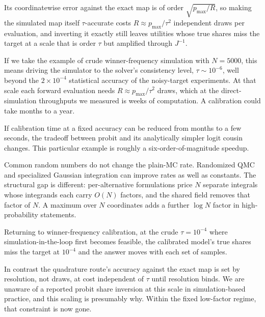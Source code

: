 \documentclass[12pt]{article}
\theoremstyle{remark}
\begin{document}
Its coordinatewise error against the exact map is of order
$\sqrt{p_{\max}/R}$, so making the simulated map itself $\tau$-accurate
costs $R \approx p_{\max}/\tau^2$ independent draws per evaluation, and
inverting it exactly still leaves utilities whose true shares miss the
target at a scale that is order $\tau$ but amplified through $J^{-1}$.

If we take the example of crude winner-frequency simulation with $N = 5000$, this
means driving the simulator to the solver's consistency level, $\tau
\sim 10^{-6}$, well beyond the $2\times10^{-4}$ statistical accuracy of the
noisy-target experiments. At that scale each forward evaluation needs
$R \approx p_{\max}/\tau^2$ draws, which at the direct-simulation
throughputs we measured is weeks of computation. A calibration could
take months to a year. 

If calibration time at a fixed accuracy can be reduced from months to
a few seconds, the tradeoff between probit and its analytically simpler logit
cousin changes. This particular example is roughly a six-order-of-magnitude speedup. 

Common random numbers do not change the plain-MC rate. Randomized QMC and
specialized Gaussian integration can improve rates as well as
constants. The structural gap is different: per-alternative
formulations price $N$ separate integrals whose integrands each carry
$O(N)$ factors, and the shared field removes that factor of $N$. A
maximum over $N$ coordinates adds a further $\log N$ factor in
high-probability statements.

Returning to winner-frequency calibration, at the crude
$\tau = 10^{-4}$ where simulation-in-the-loop first becomes feasible, the calibrated model's true
shares miss the target at $10^{-4}$ and the answer moves with each set of samples. 

In contrast the quadrature route's accuracy against the exact map is set by
resolution, not draws, at cost independent of $\tau$ until resolution
binds. We are unaware of a reported
probit share inversion at this scale in simulation-based practice, and this
scaling is presumably why. Within the fixed low-factor regime, that constraint is now gone. 
\end{document}
